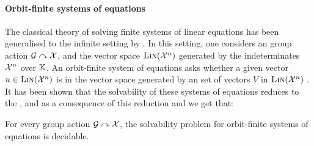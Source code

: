\paragraph{Orbit-finite systems of equations} The classical theory of solving
finite systems of linear equations has been generalised to the infinite setting
by . In this setting, one considers an 
group action $\mathcal{G}\curvearrowright\mathcal{X}$, and the vector space $\textsc{Lin}(\mathcal{X}^n)$
generated by the indeterminates $\mathcal{X}^n$ over $\mathbb{K}$. An orbit-finite
system of equations asks whether a given vector $u \in \textsc{Lin}(\mathcal{X}^n)$ is in
the vector space generated by an  set of vectors $V$ in
$\textsc{Lin}(\mathcal{X}^n)$ \cite[Section 9]{GHOLAS24}. It has been shown that the
solvability of these systems of equations reduces to the  \cite[Theorem 68]{GHOLAS24}, and as a consequence of this
reduction and  we get that:

\begin{corollary}\label{cor:lin solv}
  For every  group action $\mathcal{G}\curvearrowright\mathcal{X}$,
  the solvability problem for orbit-finite systems of equations
  is decidable.
\end{corollary}
